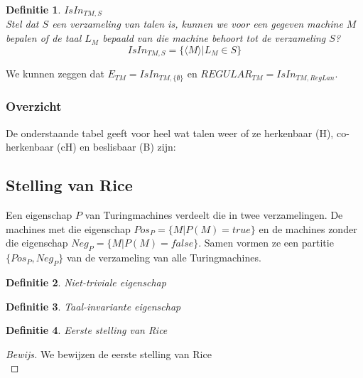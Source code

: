 \documentclass[a4paper]{article}
\newtheorem{tdefinitie}{Definitie}[section]
\newenvironment{definitie}[1]%
  {\begin{mdframed}[backgroundcolor=silver,
    topline=false,
    rightline=false,
    leftline=false,
    bottomline=false]\begin{tdefinitie}#1\\\normalfont}%
  {\end{tdefinitie}\end{mdframed}}
\newenvironment{bewijs}[1]%
  {\begin{mdframed}[topline=true,
    rightline=true,
    leftline=true,
    bottomline=true]\begin{proof}[Bewijs]#1\\[.2cm]\normalfont}%
  {\end{proof}\end{mdframed}}
\newcommand{\etm}{\ensuremath{{E_{TM}}}}
\begin{document}

\begin{definitie}{$IsIn_{TM,S}$}
  Stel dat $S$ een verzameling van talen is, kunnen we voor een gegeven machine $M$ bepalen of de taal $L_M$ bepaald van die machine behoort tot de verzameling $S$?
  \begin{equation*}
  IsIn_{TM,S} = \{\langle M \rangle|L_M \in S\}
  \end{equation*}
\end{definitie}

We kunnen zeggen dat $\etm = IsIn_{TM,\{\emptyset\}}$ en $REGULAR_{TM} = IsIn_{TM,RegLan}$.


\subsubsection{Overzicht}
De onderstaande tabel geeft voor heel wat talen weer of ze herkenbaar (H), co-herkenbaar (cH) en beslisbaar (B) zijn:



\subsection{Stelling van Rice}

Een eigenschap $P$ van Turingmachines verdeelt die in twee verzamelingen. De machines met die eigenschap $Pos_P = \{M|P(M)=true\}$ en de machines zonder die eigenschap $Neg_P = \{M|P(M)=false\}$. Samen vormen ze een partitie $\{Pos_P, Neg_P\}$ van de verzameling van alle Turingmachines.

\begin{definitie}{Niet-triviale eigenschap}
  
\end{definitie}

\begin{definitie}{Taal-invariante eigenschap}
  
\end{definitie}

\begin{definitie}{Eerste stelling van Rice}
  
\end{definitie}

\begin{bewijs}{We bewijzen de eerste stelling van Rice}
  
\end{bewijs}
\end{document}

